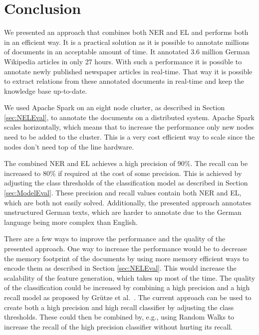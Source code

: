 \section{Conclusion}
\label{sec:Conclusion}
We presented an approach that combines both NER and EL and performs both in an efficient way. It is a practical solution as it is possible to annotate millions of documents in an acceptable amount of time. It annotated 3.6 million German Wikipedia articles in only 27 hours. With such a performance it is possible to annotate newly published newspaper articles in real-time. That way it is possible to extract relations from these annotated documents in real-time and keep the knowledge base up-to-date.\par
We used Apache Spark on an eight node cluster, as described in Section \ref{sec:NELEval}, to annotate the documents on a distributed system. Apache Spark scales horizontally, which means that to increase the performance only new nodes need to be added to the cluster. This is a very cost efficient way to scale since the nodes don't need top of the line hardware.\par
The combined NER and EL achieves a high precision of $90\%$. The recall can be increased to $80\%$ if required at the cost of some precision. This is achieved by adjusting the class thresholds of the classification model as described in Section \ref{sec:ModelEval}. These precision and recall values contain both NER and EL, which are both not easily solved. Additionally, the presented approach annotates unstructured German texts, which are harder to annotate due to the German language being more complex than English.\par
There are a few ways to improve the performance and the quality of the presented approach. One way to increase the performance would be to decrease the memory footprint of the documents by using more memory efficient ways to encode them as described in Section \ref{sec:NELEval}. This would increase the scalability of the feature generation, which takes up most of the time. The quality of the classification could be increased by combining a high precision and a high recall model as proposed by Grütze et al.\ \cite{coheel}. The current approach can be used to create both a high precision and high recall classifier by adjusting the class thresholds. These could then be combined by, e.g., using Random Walks to increase the recall of the high precision classifier without hurting its recall.
